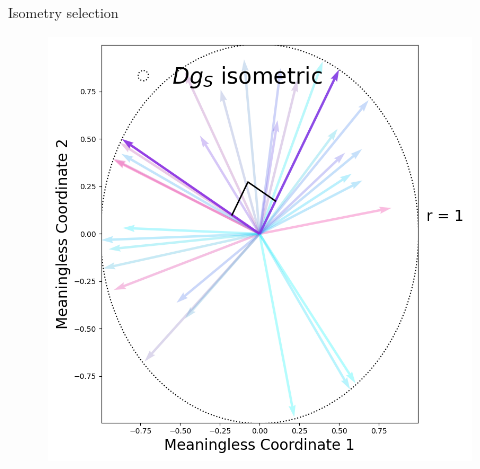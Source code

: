 \begin{frame}{Isometry selection}
\small

\begin{figure}[h!]
    \centering
    \includegraphics[width=.6\linewidth]{../figures/goldencompass.png} %
\end{figure}

\end{frame}

